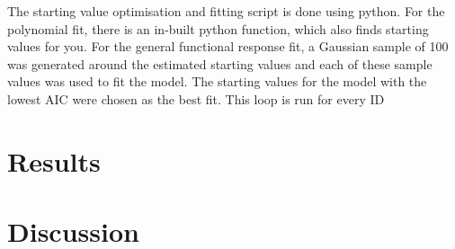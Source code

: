\documentclass[11pt, a4paper, titlepage]{article}
\begin{document}
The starting value optimisation and fitting script is done using python. For the polynomial fit, there is an in-built python function, which also finds
starting values for you. For the general functional response fit, a Gaussian sample of 100 was generated around the estimated starting values and each of these
sample values was used to fit the model. The starting values for the model with the lowest AIC were chosen as the best fit. This loop is run for every
ID 

\section{Results}

\section{Discussion}
\end{document}
